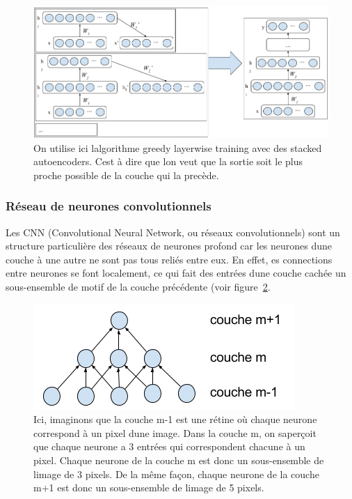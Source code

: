 \documentclass[11pt]{sdm}
\begin{document}
			\begin{figure}[!ht]
				\centering
				\includegraphics[scale=0.5,natwidth=919,natheight=412]{figures/trainDeepNetByGreedyLayerWise.png}
				\caption{On utilise ici l\textquotesingle algorithme greedy layerwise training avec des stacked autoencoders. C\textquotesingle est \`a dire que l\textquotesingle on veut que la sortie soit le plus proche possible de la couche qui la prec\`ede.}
				\label{fig:trainDeepNet}
			\end{figure}


		\subsubsection{R\'eseau de neurones convolutionnels}
			Les CNN (Convolutional Neural Network, ou r\'eseaux convolutionnels) sont un structure particuli\`ere des r\'eseaux de neurones profond car les neurones d\textquotesingle une couche \`a une autre ne sont pas tous reli\'es entre eux. En effet, es connections entre neurones se font localement, ce qui fait des entr\'ees d\textquotesingle une couche cach\'ee un sous-ensemble de motif de la couche pr\'ec\'edente (voir figure~\ref{fig:cnn}.

			\begin{figure}[!ht]
				\centering
				\includegraphics[natwidth=375,natheight=152]{figures/architectureCNN.png}
				\caption{Ici, imaginons que la couche m-1 est une r\'etine o\`u chaque neurone correspond \`a un pixel d\textquotesingle une image. Dans la couche m, on s\textquotesingle aper\c coit que chaque neurone a 3 entr\'ees qui correspondent chacune \`a un pixel. Chaque neurone de la couche m est donc un sous-ensemble de l\textquotesingle image de 3 pixels. De la m\^eme fa\c con, chaque neurone de la couche m+1 est donc un sous-ensemble de l\textquotesingle image de 5 pixels.}
				\label{fig:cnn}
			\end{figure}
\end{document}
